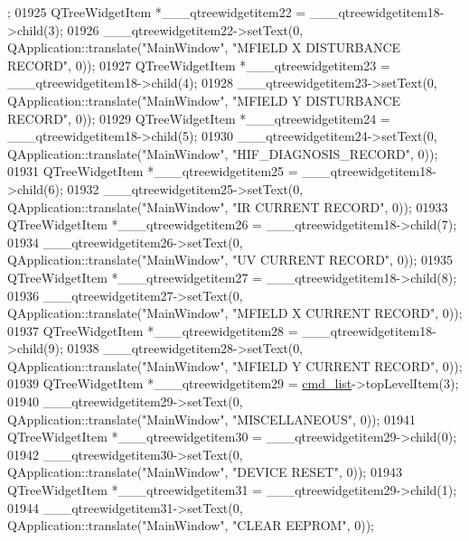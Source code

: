 \begin{DoxyCode}
      ;
01925         QTreeWidgetItem *\_\_\_qtreewidgetitem22 = \_\_\_qtreewidgetitem18->child(3);
01926         \_\_\_qtreewidgetitem22->setText(0, QApplication::translate(\textcolor{stringliteral}{"MainWindow"}, \textcolor{stringliteral}{"MFIELD X  DISTURBANCE
       RECORD"}, 0));
01927         QTreeWidgetItem *\_\_\_qtreewidgetitem23 = \_\_\_qtreewidgetitem18->child(4);
01928         \_\_\_qtreewidgetitem23->setText(0, QApplication::translate(\textcolor{stringliteral}{"MainWindow"}, \textcolor{stringliteral}{"MFIELD Y  DISTURBANCE
       RECORD"}, 0));
01929         QTreeWidgetItem *\_\_\_qtreewidgetitem24 = \_\_\_qtreewidgetitem18->child(5);
01930         \_\_\_qtreewidgetitem24->setText(0, QApplication::translate(\textcolor{stringliteral}{"MainWindow"}, \textcolor{stringliteral}{"HIF\_DIAGNOSIS\_RECORD"}, 0));
01931         QTreeWidgetItem *\_\_\_qtreewidgetitem25 = \_\_\_qtreewidgetitem18->child(6);
01932         \_\_\_qtreewidgetitem25->setText(0, QApplication::translate(\textcolor{stringliteral}{"MainWindow"}, \textcolor{stringliteral}{"IR CURRENT RECORD"}, 0));
01933         QTreeWidgetItem *\_\_\_qtreewidgetitem26 = \_\_\_qtreewidgetitem18->child(7);
01934         \_\_\_qtreewidgetitem26->setText(0, QApplication::translate(\textcolor{stringliteral}{"MainWindow"}, \textcolor{stringliteral}{"UV CURRENT RECORD"}, 0));
01935         QTreeWidgetItem *\_\_\_qtreewidgetitem27 = \_\_\_qtreewidgetitem18->child(8);
01936         \_\_\_qtreewidgetitem27->setText(0, QApplication::translate(\textcolor{stringliteral}{"MainWindow"}, \textcolor{stringliteral}{"MFIELD X  CURRENT RECORD"}, 
      0));
01937         QTreeWidgetItem *\_\_\_qtreewidgetitem28 = \_\_\_qtreewidgetitem18->child(9);
01938         \_\_\_qtreewidgetitem28->setText(0, QApplication::translate(\textcolor{stringliteral}{"MainWindow"}, \textcolor{stringliteral}{"MFIELD Y  CURRENT RECORD"}, 
      0));
01939         QTreeWidgetItem *\_\_\_qtreewidgetitem29 = \hyperlink{a00027_aa66ece71395b435e915d384fb63bac1d}{cmd\_list}->topLevelItem(3);
01940         \_\_\_qtreewidgetitem29->setText(0, QApplication::translate(\textcolor{stringliteral}{"MainWindow"}, \textcolor{stringliteral}{"MISCELLANEOUS"}, 0));
01941         QTreeWidgetItem *\_\_\_qtreewidgetitem30 = \_\_\_qtreewidgetitem29->child(0);
01942         \_\_\_qtreewidgetitem30->setText(0, QApplication::translate(\textcolor{stringliteral}{"MainWindow"}, \textcolor{stringliteral}{"DEVICE RESET"}, 0));
01943         QTreeWidgetItem *\_\_\_qtreewidgetitem31 = \_\_\_qtreewidgetitem29->child(1);
01944         \_\_\_qtreewidgetitem31->setText(0, QApplication::translate(\textcolor{stringliteral}{"MainWindow"}, \textcolor{stringliteral}{"CLEAR EEPROM"}, 0));

\end{DoxyCode}
